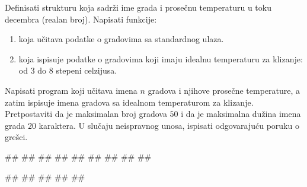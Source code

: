 \begin{Exercise}[label=struc.3] 
Definisati strukturu  koja sadrži ime grada i prosečnu temperaturu u toku decembra (realan
broj). Napisati funkcije:
\begin{enumerate}
  \item {} koja učitava podatke
  o gradovima sa standardnog ulaza. 
  \item {} koja ispisuje podatke
  o gradovima koji imaju idealnu temperaturu za klizanje: od $3$ do $8$ stepeni celzijusa. 
\end{enumerate}
Napisati program koji učitava imena $n$ gradova i
njihove prosečne temperature, a zatim ispisuje imena gradova sa idealnom temperaturom za klizanje.
Pretpostaviti da je maksimalan broj gradova $50$ i da je maksimalna dužina imena grada $20$ karaktera.
U slučaju neispravnog unosa, ispisati odgovarajuću poruku o grešci.
 
\begin{maxitest}
\begin{upotreba}{1}
#\naslovInt#
##
##
##
##
##
##
##
##
\end{upotreba}
\end{maxitest}

\begin{maxitest}
\begin{upotreba}{2}
#\naslovInt#
##
##
##
##
\end{upotreba}
\end{maxitest}
 
\end{Exercise}
\ifresenja
\begin{Answer}[ref=struc.3]
\end{Answer}
\fi


